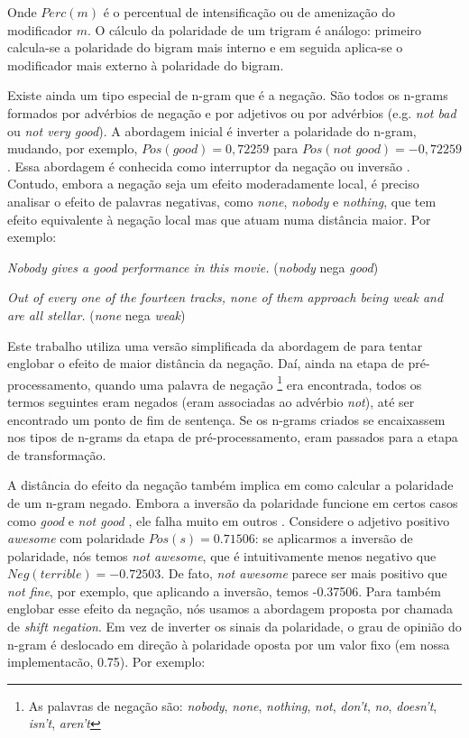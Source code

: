 Onde $Perc(m)$ é o percentual de intensificação ou de amenização do modificador $m$. O cálculo da polaridade de um trigram é análogo: primeiro calcula-se a polaridade do bigram mais interno e em seguida aplica-se o modificador mais externo à polaridade do bigram.

Existe ainda um tipo especial de n-gram que é a negação. São todos os n-grams formados por advérbios de negação e por adjetivos ou por advérbios (e.g. \textit{not bad} ou \textit{not very good}). A abordagem inicial é inverter a polaridade do n-gram, mudando, por exemplo, $Pos(\textit{good}) = 0,72259$ para $Pos(\textit{not good}) = - 0,72259$. Essa abordagem é conhecida como interruptor da negação ou inversão \cite{sauri2008factuality}. Contudo, embora a negação seja um efeito moderadamente local, é preciso analisar o efeito de palavras negativas, como \textit{none}, \textit{nobody} e \textit{nothing}, que tem efeito equivalente à negação local \cite{taboada2011lexicon} mas que atuam numa distância maior. Por exemplo:

\begin{example}
\textit{Nobody gives a good performance in this movie.} (\textit{nobody} nega \textit{good})
\label{ex:far_neg_1}
\end{example}

\begin{example}
\textit{Out of every one of the fourteen tracks, none of them approach being weak and are all stellar.} (\textit{none} nega \textit{weak})
\label{ex:far_neg_2}
\end{example}

Este trabalho utiliza uma versão simplificada da abordagem de \cite{das2001yahoo} para tentar englobar o efeito de maior distância da negação. Daí, ainda na etapa de pré-processamento, quando uma palavra de negação \footnote{As palavras de negação são: \textit{nobody}, \textit{none}, \textit{nothing}, \textit{not}, \textit{don't}, \textit{no}, \textit{doesn't}, \textit{isn't}, \textit{aren't}} era encontrada, todos os termos seguintes eram negados (eram associadas ao advérbio \textit{not}), até ser encontrado um ponto de fim de sentença. Se os n-grams criados se encaixassem nos tipos de n-grams da etapa de pré-processamento, eram passados para a etapa de transformação. 

A distância do efeito da negação também implica em como calcular a polaridade de um n-gram negado. Embora a inversão da polaridade funcione em certos casos como \textit{good} e \textit{not good} \cite{choi2008learning}, ele falha muito em outros \cite{liu2009review}. Considere o adjetivo positivo \textit{awesome} com polaridade $Pos(s) = 0.71506 $: se aplicarmos a inversão de polaridade, nós temos \textit{not awesome}, que é intuitivamente menos negativo que $Neg(\textit{terrible}) = -0.72503$. De fato, \textit{not awesome} parece ser mais positivo que \textit{not fine}, por exemplo, que aplicando a inversão, temos -0.37506. Para também englobar esse efeito da negação, nós usamos a abordagem proposta por \cite{taboada2011lexicon} chamada de \textit{shift negation}. Em vez de inverter os sinais da polaridade, o grau de opinião do n-gram é deslocado em direção à polaridade oposta por um valor fixo (em nossa implementacão, 0.75). Por exemplo:

